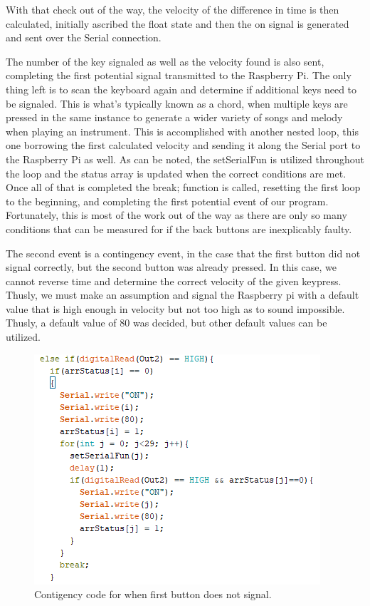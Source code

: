 With that check out of the way, the velocity of the difference in time is then calculated,
initially ascribed the float state and then the on signal is generated and sent over the
Serial connection.

The number of the key signaled as well as the velocity found is also sent, completing the
first potential signal transmitted to the Raspberry Pi. The only thing left is to scan the
keyboard again and determine if additional keys need to be signaled. This is what’s
typically known as a chord, when multiple keys are pressed in the same instance to
generate a wider variety of songs and melody when playing an instrument. This is
accomplished with another nested loop, this one borrowing the first calculated velocity
and sending it along the Serial port to the Raspberry Pi as well. As can be noted, the
setSerialFun is utilized throughout the loop and the status array is updated when the
correct conditions are met. Once all of that is completed the break; function is called,
resetting the first loop to the beginning, and completing the first potential event of our
program. Fortunately, this is most of the work out of the way as there are only so many
conditions that can be measured for if the back buttons are inexplicably faulty.

The second event is a contingency event, in the case that the first button did not signal
correctly, but the second button was already pressed. In this case, we cannot reverse time
and determine the correct velocity of the given keypress. Thusly, we must make an
assumption and signal the Raspberry pi with a default value that is high enough in
velocity but not too high as to sound impossible. Thusly, a default value of 80 was
decided, but other default values can be utilized.

\begin{figure}[h!]
  \centering
  \includegraphics{image/backupfunction.png}
  \caption{Contigency code for when first button does not signal.}
\end{figure}

